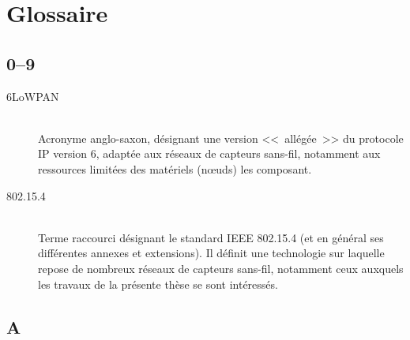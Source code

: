 
\chapter*{Glossaire}
\label{AnxGlossaire}


\section*{0--9}

\begin{description}

\item[6LoWPAN]  \\
Acronyme anglo-saxon, désignant une version <<~allégée~>> du protocole IP
version 6, adaptée aux réseaux de capteurs sans-fil, notamment aux
ressources limitées des matériels (n{\oe}uds) les composant.

\item[802.15.4] \ \\
Terme raccourci désignant le standard IEEE 802.15.4 (et en général ses
différentes annexes et extensions). Il définit une technologie sur laquelle
repose de nombreux réseaux de capteurs sans-fil, notamment ceux auxquels
les travaux de la présente thèse se sont intéressés.

\end{description}


\section*{A}

